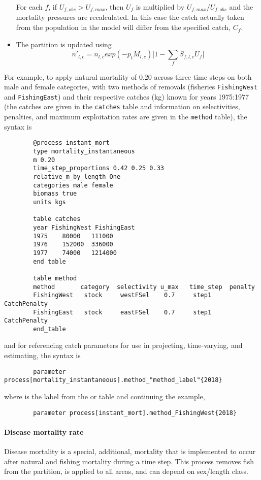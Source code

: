 \begin{itemize}
	For each $f$, if $U_{f,obs} > U_{f,max}$, then $U_f$ is multiplied by $U_{f,max}/U_{f,obs}$ and the mortality pressures are recalculated. In this case the catch actually taken from the population in the model will differ from the specified catch, $C_f$.
	
	\item The partition is updated using
	$$ n'_{l,c} = n_{l,c} exp(-p_t M_{l,c})\big[1 - \sum_f S_{f,l,c} U_{f} \big] $$
\end{itemize}

For example, to apply natural mortality of $0.20$ across three time steps on both male and female categories, with two methods of removals (fisheries \texttt{FishingWest} and \texttt{FishingEast}) and their respective catches (kg) known for years 1975:1977 (the catches are given in the \texttt{catches} table and information on selectivities, penalties, and maximum exploitation rates are given in the \texttt{method} table), the syntax is


{\small{\begin{verbatim}
		@process instant_mort
		type mortality_instantaneous
		m 0.20
		time_step_proportions 0.42 0.25 0.33
		relative_m_by_length One
		categories male female
		biomass true
		units kgs
		
		table catches
		year FishingWest FishingEast
		1975	80000	111000
		1976	152000	336000
		1977	74000	1214000
		end table
		
		table method
		method       category  selectivity u_max   time_step  penalty
		FishingWest   stock     westFSel    0.7     step1     CatchPenalty
		FishingEast   stock     eastFSel    0.7     step1     CatchPenalty
		end_table
		\end{verbatim}}}

and for referencing catch parameters for use in projecting, time-varying, and estimating, the syntax is

{\small{\begin{verbatim}
		parameter process[mortality_instantaneous].method_"method_label"{2018}
		\end{verbatim}}}

where  is the label from the  or  table and continuing the example,

{\small{\begin{verbatim}
		parameter process[instant_mort].method_FishingWest{2018}
		\end{verbatim}}}


\paragraph{Disease mortality rate}\label{sec:Process-Length-DiseaseMortalityRate} 
Disease mortality is a special, additional, mortality that is implemented to occur after natural and fishing mortality during a time step. This process removes fish from the partition, is applied to all areas, and can depend on sex/length class.

